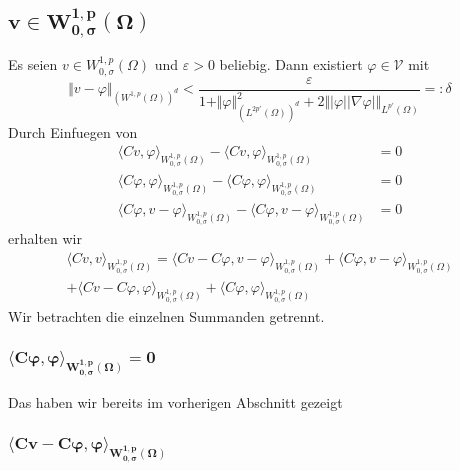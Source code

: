 \documentclass{article}
\begin{document}
\subsection*{$\bm{v \in W_{0, \sigma}^{1,p}(\Omega)}$}

Es seien $v \in W_{0, \sigma}^{1,p}(\Omega)$ und $\varepsilon>0$ beliebig. Dann existiert $\varphi \in \mathcal{V}$ mit
\begin{equation*}
  \Vert v - \varphi \Vert_{(W^{1,p}(\Omega))^d}
  < \frac{\varepsilon}{1 + \Vert \varphi \Vert_{(L^{2 p'}(\Omega))^d}^2 + 2  \Vert \vert \varphi \vert \vert \nabla \varphi \vert \Vert_{L^{p'}(\Omega)}}
  =: \delta
\end{equation*}
Durch Einfuegen von
\begin{equation*}
  \begin{aligned}
    \langle Cv, \varphi \rangle_{W_{0, \sigma}^{1,p} (\Omega)}
    - \langle Cv, \varphi \rangle_{W_{0, \sigma}^{1,p} (\Omega)}
    &= 0 \\
    \langle C \varphi, \varphi \rangle_{W_{0, \sigma}^{1,p} (\Omega)}
    - \langle C \varphi, \varphi \rangle_{W_{0, \sigma}^{1,p} (\Omega)} &= 0 \\
    \langle C \varphi, v - \varphi \rangle_{W_{0, \sigma}^{1,p} (\Omega)}
    - \langle C \varphi, v - \varphi \rangle_{W_{0, \sigma}^{1,p} (\Omega)}
    &= 0
  \end{aligned}
\end{equation*}
erhalten wir
\begin{multline*}
    \langle Cv, v \rangle_{W_{0, \sigma}^{1,p} (\Omega)}
    = \langle Cv - C \varphi, v - \varphi \rangle_{W_{0, \sigma}^{1,p} (\Omega)} 
    + \langle C \varphi, v - \varphi \rangle_{W_{0, \sigma}^{1,p} (\Omega)} \\
    + \langle Cv - C \varphi, \varphi \rangle_{W_{0, \sigma}^{1,p} (\Omega)} 
    + \langle C \varphi, \varphi \rangle_{W_{0, \sigma}^{1,p} (\Omega)}
\end{multline*}
Wir betrachten die einzelnen Summanden getrennt.

\subsubsection*{$\bm{\langle C \varphi, \varphi \rangle_{W_{0, \sigma}^{1,p} (\Omega)} = 0}$}

Das haben wir bereits im vorherigen Abschnitt gezeigt

\subsubsection*{$\bm{\langle Cv - C \varphi, \varphi \rangle_{W_{0, \sigma}^{1,p} (\Omega)}}$}
\end{document}
